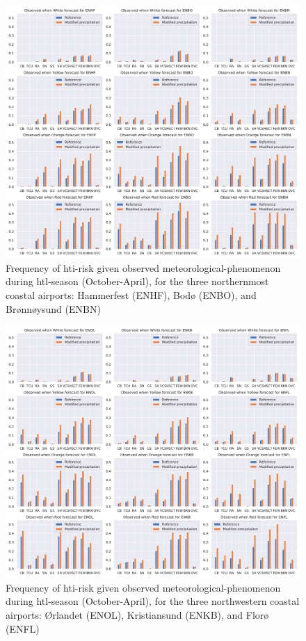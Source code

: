 \begin{figure}
    \centering
    \includegraphics[width=\textwidth]{Figures/HTIMetar1.pdf}
    \caption{Frequency of \acrshort{hti}-risk given observed meteorological-phenomenon during \acrshort{htl}-season (October-April), for the three northernmost coastal airports: Hammerfest (ENHF), Bodø (ENBO), and Brønnøysund (ENBN)}
    \label{fig:HTIMETAR1}
\end{figure}

\begin{figure}
    \centering
    \includegraphics[width=\textwidth]{Figures/HTIMetar2.pdf}
    \caption{Frequency of \acrshort{hti}-risk given observed meteorological-phenomenon during \acrshort{htl}-season (October-April), for the three northwestern coastal airports: Ørlandet (ENOL), Kristiansund (ENKB), and Florø (ENFL)}
    \label{fig:HTIMETAR2}
\end{figure}


